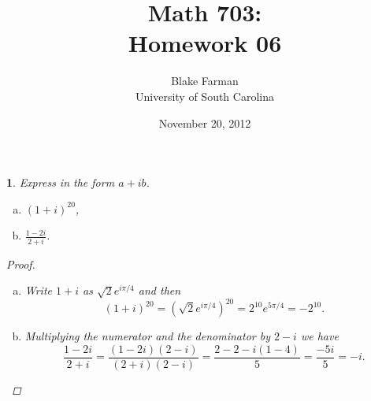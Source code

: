 \documentclass[12pt]{amsart}
\author{Blake Farman\\University of South Carolina}
\title{Math 703:\\Homework 06}
\date{November 20, 2012}
\begin{document}
\maketitle

\newcommand{\Z}{\mathbb{Z}}
\newcommand{\R}{\mathbb{R}}
\newcommand{\Q}{\mathbb{Q}}
\newcommand{\C}{\mathbb{C}}
\newcommand{\F}{\mathbb{F}}
\newcommand{\N}{\mathbb{N}}
\newcommand{\uhp}{\mathfrak{h}}

\newcommand{\ord}{\operatorname{ord}}
\newcommand{\Det}{\operatorname{Det}}
\newcommand{\Gal}{\operatorname{Gal}}
\newcommand{\Inn}[1]{\operatorname{Inn}\left(#1\right)}
\newcommand{\Aut}[1]{\operatorname{Aut}\left(#1\right)}
\newcommand{\real}[1]{\operatorname{\mathfrak{Re}}\left(#1\right)}
\newcommand{\imag}[1]{\operatorname{\mathfrak{Im}}\left(#1\right)}
\newcommand{\Syl}[2]{\operatorname{Syl}_{#1}\left(#2\right)}
\newcommand{\SL}[2]{\operatorname{SL}_#1\left(#2\right)}
\newcommand{\GL}[2]{\operatorname{GL}_#1\left(#2\right)}
\newcommand{\M}[2]{\operatorname{M}_#1\left(#2\right)}
\newcommand{\PSL}[2]{\operatorname{PSL}_#1\left(#2\right)}
\newcommand{\Mat}[2]{\operatorname{Mat}_{#1}\left(#2\right)}
\providecommand{\norm}[1]{\lVert#1\rVert}
\newcommand{\dist}[2]{\operatorname{dist}\left(#1,#2\right)}
\newcommand{\cntr}[1]{\mathbf{Z}\left(#1\right)}
\newcommand{\abs}[1]{\left| #1 \right|}
\newcommand{\orbit}[1]{\mathcal{O}_{#1}}
\newcommand{\card}[1]{\operatorname{card}#1}
\newcommand{\Log}[1]{\operatorname{Log}\left(#1\right)}
\newcommand{\Arg}[1]{\operatorname{Arg}\left(#1\right)}

\renewcommand{\qedsymbol}{\(\blacksquare\)}
\renewcommand{\epsilon}{\varepsilon}

\newtheorem{thm}{}
\setcounter{thm}{20}
\newtheorem{ex}{}[thm]
\newtheorem{lem}{Lemma}
\theoremstyle{definition}
\newtheorem{defn}{Definition}

\begin{thm}
  Express in the form $a + ib$.
  
  \begin{enumerate}[(a)]
  \item
    $(1 + i)^{20}$,
  \item
    $\frac{1 - 2i}{2 + i}$.
  \end{enumerate}
  
  \begin{proof}
    \begin{enumerate}[(a)]
      \item
        Write $1 + i$ as $\sqrt{2}e^{i\pi/4}$ and then 
        $$(1 + i)^{20} = (\sqrt{2}e^{i\pi/4})^{20} = 2^{10}e^{5\pi/4} = -2^{10}.$$
      \item
        Multiplying the numerator and the denominator by $2 - i$ we have
        $$\frac{1 - 2i}{2 + i} = \frac{(1 - 2i)(2 - i)}{(2 + i)(2 - i)} = \frac{2 - 2 - i(1 - 4)}{5} = \frac{-5i}{5} = -i.$$
    \end{enumerate}
  \end{proof}
\end{thm}
\end{document}

